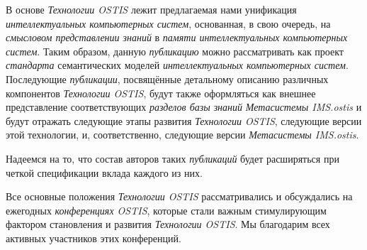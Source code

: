 \begin{SCn}
{В основе \textit{Технологии OSTIS} лежит предлагаемая нами унификация \textit{интеллектуальных компьютерных систем}, основанная, в свою очередь, на \textit{смысловом представлении знаний} в \textit{памяти интеллектуальных компьютерных систем}. Таким образом, данную \textit{публикацию} можно рассматривать как проект \textit{стандарта} семантических моделей \textit{интеллектуальных компьютерных систем}. Последующие \textit{публикации}, посвящённые детальному описанию различных компонентов \textit{Технологии OSTIS}, будут также оформляться как внешнее представление соответствующих \textit{разделов базы знаний} \scnbigspace \textit{Метасистемы IMS.ostis} и будут отражать следующие этапы развития  \textit{Технологии OSTIS}, следующие версии этой технологии, и, соответственно, следующие версии \textit{Метасистемы IMS.ostis}. 

Надеемся на то, что состав авторов таких \textit{публикаций} будет расширяться при четкой спецификации вклада каждого из них. 

Все основные положения \textit{Технологии OSTIS} рассматривались и обсуждались на ежегодных \textit{конференциях OSTIS}, которые стали важным стимулирующим фактором становления и развития \textit{Технологии OSTIS}. Мы благодарим всех активных участников этих конференций.

}
\end{SCn}
